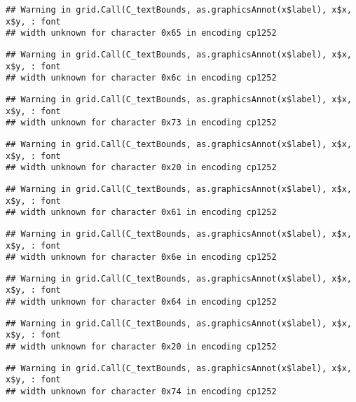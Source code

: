 \documentclass[
]{article}
\begin{document}
\begin{verbatim}
## Warning in grid.Call(C_textBounds, as.graphicsAnnot(x$label), x$x, x$y, : font
## width unknown for character 0x65 in encoding cp1252
\end{verbatim}

\begin{verbatim}
## Warning in grid.Call(C_textBounds, as.graphicsAnnot(x$label), x$x, x$y, : font
## width unknown for character 0x6c in encoding cp1252
\end{verbatim}

\begin{verbatim}
## Warning in grid.Call(C_textBounds, as.graphicsAnnot(x$label), x$x, x$y, : font
## width unknown for character 0x73 in encoding cp1252
\end{verbatim}

\begin{verbatim}
## Warning in grid.Call(C_textBounds, as.graphicsAnnot(x$label), x$x, x$y, : font
## width unknown for character 0x20 in encoding cp1252
\end{verbatim}

\begin{verbatim}
## Warning in grid.Call(C_textBounds, as.graphicsAnnot(x$label), x$x, x$y, : font
## width unknown for character 0x61 in encoding cp1252
\end{verbatim}

\begin{verbatim}
## Warning in grid.Call(C_textBounds, as.graphicsAnnot(x$label), x$x, x$y, : font
## width unknown for character 0x6e in encoding cp1252
\end{verbatim}

\begin{verbatim}
## Warning in grid.Call(C_textBounds, as.graphicsAnnot(x$label), x$x, x$y, : font
## width unknown for character 0x64 in encoding cp1252
\end{verbatim}

\begin{verbatim}
## Warning in grid.Call(C_textBounds, as.graphicsAnnot(x$label), x$x, x$y, : font
## width unknown for character 0x20 in encoding cp1252
\end{verbatim}

\begin{verbatim}
## Warning in grid.Call(C_textBounds, as.graphicsAnnot(x$label), x$x, x$y, : font
## width unknown for character 0x74 in encoding cp1252
\end{verbatim}
\end{document}
